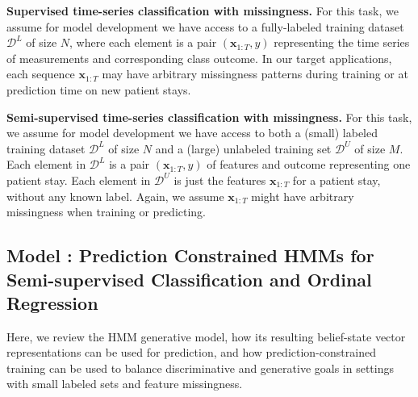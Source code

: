 \textbf{Supervised time-series classification with missingness.} 
For this task, we assume for model development we have access to a fully-labeled training dataset $\mathcal{D}^L$ of size $N$, where each element is a pair $(\mathbf{x}_{1:T}, y)$ representing the time series of measurements and corresponding class outcome.
In our target applications, each sequence $\mathbf{x}_{1:T}$ may have arbitrary missingness patterns during training or at prediction time on new patient stays.

\textbf{Semi-supervised time-series classification with missingness.}
For this task, we assume for model development we have access to both a (small) labeled training dataset $\mathcal{D}^L$ of size $N$ and a (large) unlabeled training set
$\mathcal{D}^U$ of size $M$.
Each element in $\mathcal{D}^L$ is a pair $(\mathbf{x}_{1:T}, y)$ of features and outcome representing one patient stay.
Each element in $\mathcal{D}^U$ is just the features $\mathbf{x}_{1:T}$ for a patient stay, without any known label. Again, we assume $\mathbf{x}_{1:T}$ might have arbitrary missingness when training or predicting.

\subsection{Model : Prediction Constrained HMMs for Semi-supervised Classification and Ordinal Regression}
Here, we review the HMM generative model, how its resulting belief-state vector representations can be used for prediction, and how prediction-constrained training can be used to balance discriminative and generative goals in settings with small labeled sets and feature missingness.

